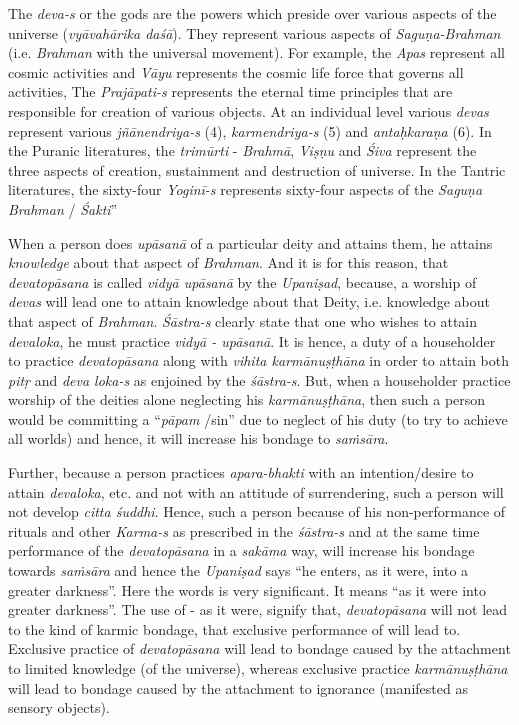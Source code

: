 The \emph{deva-s} or the gods are the powers which preside over various aspects of the universe (\emph{vyāvahārika daśā}). They represent various aspects of \emph{Saguṇa-Brahman} (i.e. \emph{Brahman} with the universal movement). For example, the \emph{Apas} represent all cosmic activities and \emph{Vāyu} represents the cosmic life force that governs all activities, The \emph{Prajāpati-s} represents the eternal time principles that are responsible for creation of various objects. At an individual level various \emph{devas} represent various \emph{jñānendriya-s} (4), \emph{karmendriya-s} (5) and \emph{antaḥkaraṇa} (6). In the Puranic literatures, the \emph{trimūrti} - \emph{Brahmā}, \emph{Viṣṇu} and \emph{Śiva} represent the three aspects of creation, sustainment and destruction of universe. In the Tantric literatures, the sixty-four \emph{Yoginī-s} represents sixty-four aspects of the \emph{Saguṇa Brahman} / \emph{Śakti}''

When a person does \emph{upāsanā} of a particular deity and attains them, he attains \emph{knowledge} about that aspect of \emph{Brahman}. And it is for this reason, that \emph{devatopāsana} is called \emph{vidyā upāsanā} by the \emph{Upaniṣad}, because, a worship of \emph{devas} will lead one to attain knowledge about that Deity, i.e. knowledge about that aspect of \emph{Brahman}. \emph{Śāstra-s} clearly state that one who wishes to attain \emph{devaloka}, he must practice \emph{vidyā - upāsanā}. It is hence, a duty of a householder to practice \emph{devatopāsana} along with \emph{vihita karmānuṣṭhāna} in order to attain both \emph{pitṛ} and \emph{deva loka-s} as enjoined by the \emph{śāstra-s}. But, when a householder practice worship of the deities alone neglecting his \emph{karmānuṣṭhāna}, then such a person would be committing a ``\emph{pāpam} /sin'' due to neglect of his duty (to try to achieve all worlds) and hence, it will increase his bondage to \emph{saṁsāra}.

Further, because a person practices \emph{apara-bhakti} with an intention/desire to attain \emph{devaloka}, etc. and not with an attitude of surrendering, such a person will not develop \emph{citta śuddhi}. Hence, such a person because of his non-performance of rituals and other \emph{Karma-s} as prescribed in the \emph{śāstra-s} and at the same time performance of the \emph{devatopāsana} in a \emph{sakāma} way, will increase his bondage towards \emph{saṁsāra} and hence the \emph{Upaniṣad} says ``he enters, as it were, into a greater darkness''. Here the words  is very significant. It means ``as it were into greater darkness''. The use of - as it were, signify that, \emph{devatopāsana} will not lead to the kind of karmic bondage, that exclusive performance of will lead to. Exclusive practice of \emph{devatopāsana} will lead to bondage caused by the attachment to limited knowledge (of the universe), whereas exclusive practice \emph{karmānuṣṭhāna} will lead to bondage caused by the attachment to ignorance (manifested as sensory objects).

